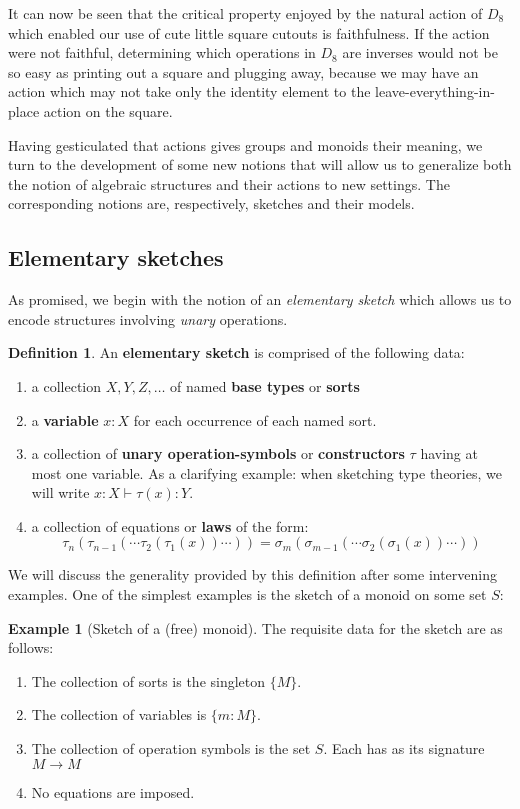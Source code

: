 \documentclass[12pt,twoside]{reedthesis}
\theoremstyle{definition}
\newtheorem{definition}{Definition}
\newtheorem{example}{Example}
\theoremstyle{remark}
\theoremstyle{plain}
\begin{document}
It can now be seen that the critical property enjoyed by the natural action of
$D_{8}$ which enabled our use of cute little square cutouts is faithfulness. If
the action were not faithful, determining which operations in $D_{8}$ are
inverses would not be so easy as printing out a square and plugging away,
because we may have an action which may not take only the identity element to
the leave-everything-in-place action on the square.


Having gesticulated that actions gives groups and monoids their meaning, we turn
to the development of some new notions that will allow us to generalize both the
notion of algebraic structures and their actions to new
settings. %
The corresponding notions are, respectively, sketches and their models.

\subsection{Elementary sketches}
As promised, we begin with the notion of an \emph{elementary sketch} which
allows us to encode structures involving \emph{unary} operations.
\begin{definition}\label{def:elem sketch}
  An \textbf{elementary sketch} is comprised of the following data:
  \begin{enumerate}
    \item a collection \(X, Y, Z, \dots \) of named \textbf{base types} or
          \textbf{sorts}
    \item a \textbf{variable} \(x:X\) for each occurrence of each named sort.
    \item a collection of \textbf{unary operation-symbols} or
          \textbf{constructors} \(\tau\) having at most one variable. As a
          clarifying example: when sketching type theories, we will write
          \( x:X \vdash \tau(x) : Y \).
    \item a collection of equations or \textbf{laws} of the
          form: \[ \tau_n (\tau_{n-1}(\cdots \tau_2 (\tau_1 (x))\cdots )) = \sigma_m (\sigma_{m-1}(\cdots \sigma_2 (\sigma_1 (x))\cdots )) \]
  \end{enumerate}
\end{definition}
We will discuss the generality provided by this definition after some
intervening examples. One of the simplest examples is the sketch of a monoid on some set $S$:

\begin{example}[Sketch of a (free) monoid]\label{ex:monoid sketch}
  The requisite data for the sketch are as follows:
  \begin{enumerate}
    \item The collection of sorts is the singleton \( \{M\} \).
    \item The collection of variables is \( \{m:M\} \).
    \item The collection of operation symbols is the set \( S \). Each has as its signature \( M \rightarrow M \)
    \item No equations are imposed.
  \end{enumerate}
\end{example}
\end{document}

